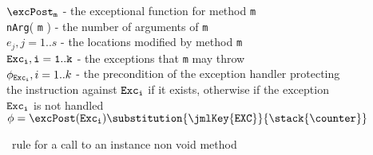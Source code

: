 \begin{figure}[!ht]
$\excPost_{\texttt{m}}$ - the   exceptional   function   for   method  \texttt{m}  \\
\texttt{nArg}( \texttt{m} ) -  the    number   of   arguments   of   \texttt{m} \\  
$e_{j} , j = 1 .. s$ - the   locations   modified   by   method   \texttt{m} \\
$\tt{Exc_i}, i = 1..k$ -  the   exceptions   that  \texttt{m} may  throw \\
$\phi_{\tt{Exc_i}}, i = 1..k$ -   the   precondition  
of the exception handler protecting the instruction against 
 $\tt{Exc_i} $  if   it    exists,   otherwise if   the exception   $\tt{Exc_i}$ is not handled    
   $ \phi = \excPost( \tt{Exc_i}) \substitution{ \jmlKey{EXC}}{ \stack{\counter}}$

\caption{\sc \wpi \ rule for a call to an instance non void method}
\label{wpInv}
\end{figure}
